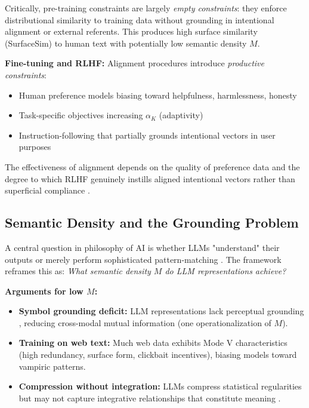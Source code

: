 \documentclass[12pt]{article}
\begin{document}
Critically, pre-training constraints are largely \textit{empty constraints}: they enforce distributional similarity to training data without grounding in intentional alignment or external referents. This produces high surface similarity (SurfaceSim) to human text with potentially low semantic density $M$.

\textbf{Fine-tuning and RLHF:} Alignment procedures introduce \textit{productive constraints}:
\begin{itemize}
\item Human preference models biasing toward helpfulness, harmlessness, honesty \citep{ouyang2022training}
\item Task-specific objectives increasing $\alpha_K$ (adaptivity)
\item Instruction-following that partially grounds intentional vectors in user purposes
\end{itemize}

The effectiveness of alignment depends on the quality of preference data and the degree to which RLHF genuinely instills aligned intentional vectors rather than superficial compliance \citep{wolf2023fundamental}.

\subsection{Semantic Density and the Grounding Problem}

A central question in philosophy of AI is whether LLMs "understand" their outputs or merely perform sophisticated pattern-matching \citep{bender2020climbing, shanahan2024talking}. The framework reframes this as: \textit{What semantic density $M$ do LLM representations achieve?}

\textbf{Arguments for low $M$:}
\begin{itemize}
\item \textbf{Symbol grounding deficit:} LLM representations lack perceptual grounding \citep{harnad1990symbol}, reducing cross-modal mutual information (one operationalization of $M$).
\item \textbf{Training on web text:} Much web data exhibits Mode V characteristics (high redundancy, surface form, clickbait incentives), biasing models toward vampiric patterns.
\item \textbf{Compression without integration:} LLMs compress statistical regularities but may not capture integrative relationships that constitute meaning \citep{piantadosi2023meaning}.
\end{itemize}
\end{document}
